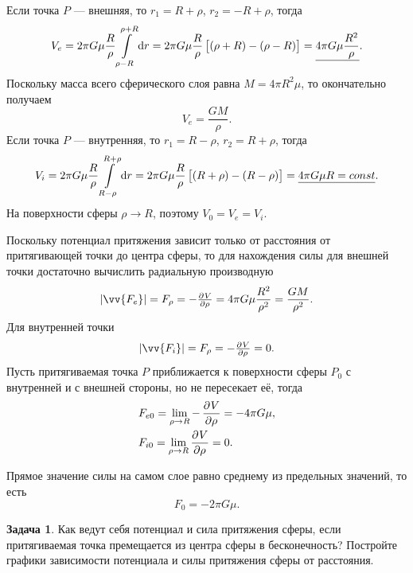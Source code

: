 \documentclass[11pt, a4paper]{article}
\theoremstyle{plain}
\theoremstyle{definition}
\newtheorem{problem}{Задача}[section]
\theoremstyle{remark}
\begin{document}
Если точка $P$ --- внешняя, то $r_1 = R + \rho$, $r_2 = - R + \rho$, тогда
\begin{equation*}
    V_e =
    2\pi G\mu \dfrac{R}{\rho}\int\limits_{\rho - R}^{\rho + R} \dif r =
    2\pi G\mu \dfrac{R}{\rho}\left[ \left( \rho + R \right) - \left( \rho - R \right) \right] =
    \underline{4\pi G\mu \dfrac{R^2}{\rho}}.
\end{equation*}
Поскольку масса всего сферического слоя равна $M = 4\pi R^2\mu$, то окончательно получаем
\begin{equation*}
    V_e = \dfrac{GM}{\rho}.
\end{equation*}
Если точка $P$ --- внутренняя, то $r_1 = R - \rho$, $r_2 = R + \rho$, тогда
\begin{equation*}
    V_i =
    2\pi G\mu \dfrac{R}{\rho}\int\limits_{R - \rho}^{R + \rho} \dif r =
    2\pi G\mu \dfrac{R}{\rho}\left[ \left( R + \rho \right) - \left( R - \rho \right) \right] =
    \underline{4\pi G\mu R = const}.
\end{equation*}
На поверхности сферы $\rho\to R$, поэтому $V_0 = V_e = V_i$.

Поскольку потенциал притяжения зависит только от расстояния от притягивающей точки до центра сферы,
то для нахождения силы для внешней точки достаточно вычислить радиальную производную
\begin{equation*}
    |\vv{F_e}| = F_\rho = -\pd{V}{\rho} = 4\pi G\mu \dfrac{R^2}{\rho^2} = \dfrac{GM}{\rho^2}.
\end{equation*}
Для внутренней точки 
\begin{equation*}
    |\vv{F_i}| = F_\rho = -\pd{V}{\rho} = 0.
\end{equation*}
Пусть притягиваемая точка $P$ приближается к поверхности сферы $P_0$ с внутренней и с внешней
стороны, но не пересекает её, тогда
\begin{align*}
    &F_{e0} = \lim_{\rho\to R} -\dpd{V}{\rho} = -4\pi G\mu, \\
    &F_{i0} = \lim_{\rho\to R} \dpd{V}{\rho} = 0.
\end{align*}

Прямое значение силы на самом слое равно среднему из предельных значений, то есть
\begin{equation*}
    F_0 = -2\pi G\mu.
\end{equation*}

\begin{problem}
    Как ведут себя потенциал и сила притяжения сферы, если притягиваемая точка премещается из центра
    сферы в бесконечность?
    Постройте графики зависимости потенциала и силы притяжения сферы от расстояния.
\end{problem}
\end{document}
